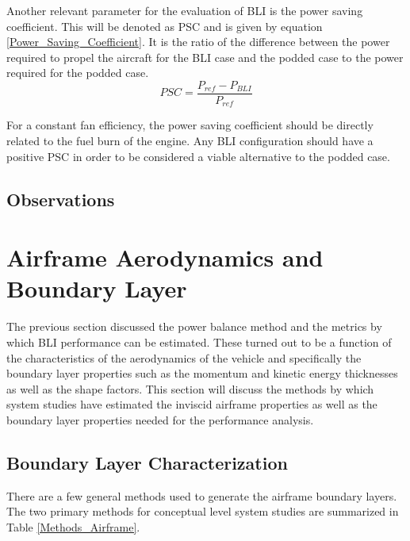 Another relevant parameter for the evaluation of BLI is the power saving coefficient.  This will be denoted as PSC and is given by equation \ref{Power_Saving_Coefficient}.  It is the ratio of the difference between the power required to propel the aircraft for the BLI case and the podded case to the power required for the podded case.
\begin{equation}PSC = \frac{P_{ref} - P_{BLI}}
			              {P_{ref}}\label{Power_Saving_Coefficient}\end{equation}%

For a constant fan efficiency, the power saving coefficient should be directly related to the fuel burn of the engine.  Any BLI configuration should have a positive PSC in order to be considered a viable alternative to the podded case.

\subsection{Observations}


\section{Airframe Aerodynamics and Boundary Layer}

The previous section discussed the power balance method and the metrics by which BLI performance can be estimated.  These turned out to be a function of the characteristics of the aerodynamics of the vehicle and specifically the boundary layer properties such as the momentum and kinetic energy thicknesses as well as the shape factors.  This section will discuss the methods by which system studies have estimated the inviscid airframe properties as well as the boundary layer properties needed for the performance analysis.

\subsection{Boundary Layer Characterization}
\indent There are a few general methods used to generate the airframe boundary layers.  The two primary methods for conceptual level system studies are summarized in Table \ref{Methods_Airframe}.  

